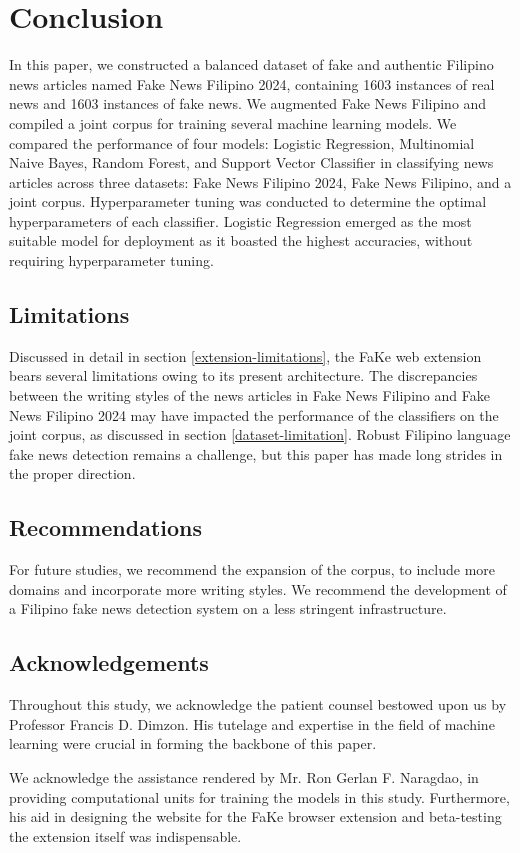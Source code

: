 \chapter{Conclusion}

In this paper, we constructed a balanced dataset of fake and authentic Filipino news articles named Fake News Filipino 2024, containing 1603 instances of real news and 1603 instances of fake news. We augmented Fake News Filipino and compiled a joint corpus for training several machine learning models. We compared the performance of four models: Logistic Regression, Multinomial Naive Bayes, Random Forest, and Support Vector Classifier in classifying news articles across three datasets: Fake News Filipino 2024, Fake News Filipino, and a joint corpus. Hyperparameter tuning was conducted to determine the optimal hyperparameters of each classifier. Logistic Regression emerged as the most suitable model for deployment as it boasted the highest accuracies, without requiring hyperparameter tuning.

\section{Limitations}

Discussed in detail in section \ref{extension-limitations}, the FaKe web extension bears several limitations owing to its present architecture. The discrepancies between the writing styles of the news articles in Fake News Filipino and Fake News Filipino 2024 may have impacted the performance of the classifiers on the joint corpus, as discussed in section \ref{dataset-limitation}. Robust Filipino language fake news detection remains a challenge, but this paper has made long strides in the proper direction.

\section{Recommendations}

For future studies, we recommend the expansion of the corpus, to include more domains and incorporate more writing styles. We recommend the development of a Filipino fake news detection system on a less stringent infrastructure. 

\section{Acknowledgements}

Throughout this study, we acknowledge the patient counsel bestowed upon us by Professor Francis D. Dimzon. His tutelage and expertise in the field of machine learning were crucial in forming the backbone of this paper.

We acknowledge the assistance rendered by Mr. Ron Gerlan F. Naragdao, in providing computational units for training the models in this study. Furthermore, his aid in designing the website for the FaKe browser extension and beta-testing the extension itself was indispensable.